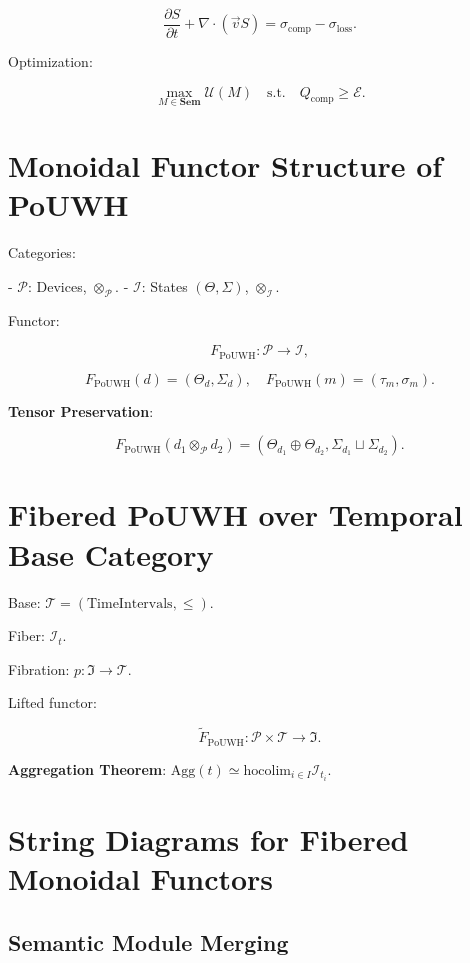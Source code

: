 \documentclass[12pt]{article}
\begin{document}
\[ \frac{\partial S}{\partial t} + \nabla \cdot (\vec{v} S) = \sigma_{\text{comp}} - \sigma_{\text{loss}}. \]

Optimization:

\[ \max_{M \in \mathbf{Sem}} \mathcal{U}(M) \quad \text{s.t.} \quad Q_{\text{comp}} \geq \mathcal{E}. \]

\section{Monoidal Functor Structure of PoUWH}
\label{app:monoidal-pouwh}

Categories:

- $ \mathcal{P} $: Devices, $ \otimes_{\mathcal{P}} $.
- $ \mathcal{I} $: States $ (\Theta, \Sigma) $, $ \otimes_{\mathcal{I}} $.

Functor:

\[ F_{\mathrm{PoUWH}}: \mathcal{P} \to \mathcal{I}, \]

\[ F_{\mathrm{PoUWH}}(d) = (\Theta_d, \Sigma_d), \quad F_{\mathrm{PoUWH}}(m) = (\tau_m, \sigma_m). \]

\textbf{Tensor Preservation}:

\[ F_{\mathrm{PoUWH}}(d_1 \otimes_{\mathcal{P}} d_2) = (\Theta_{d_1} \oplus \Theta_{d_2}, \Sigma_{d_1} \sqcup \Sigma_{d_2}). \]

\section{Fibered PoUWH over Temporal Base Category}
\label{app:fibered-pouwh}

Base: $ \mathcal{T} = (\text{TimeIntervals}, \leq) $.

Fiber: $ \mathcal{I}_t $.

Fibration: $ p: \mathfrak{I} \to \mathcal{T} $.

Lifted functor:

\[ \widetilde{F}_{\mathrm{PoUWH}}: \mathcal{P} \times \mathcal{T} \to \mathfrak{I}. \]

\textbf{Aggregation Theorem}: $ \mathrm{Agg}(t) \simeq \mathrm{hocolim}_{i \in I} \mathcal{I}_{t_i} $.

\section{String Diagrams for Fibered Monoidal Functors}
\label{app:string-diagrams}

\subsection{Semantic Module Merging}
\end{document}
